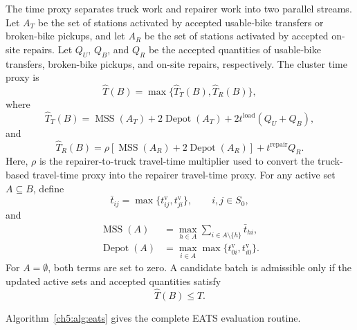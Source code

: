 The time proxy separates truck work and repairer work into two parallel streams.
Let $A_T$ be the set of stations activated by accepted usable-bike transfers or
broken-bike pickups, and let $A_R$ be the set of stations activated by accepted
on-site repairs. Let $Q_U$, $Q_B$, and $Q_R$ be the accepted quantities of
usable-bike transfers, broken-bike pickups, and on-site repairs, respectively.
The cluster time proxy is
\begin{equation}
\widehat T(B)=\max\{\widehat T_T(B),\widehat T_R(B)\},
\label{ch5:eq:eats-cluster-time}
\end{equation}
where
\begin{equation}
\widehat T_T(B)
=\operatorname{MSS}(A_T)
+2\operatorname{Depot}(A_T)
+2t^{\mathrm{load}}(Q_U+Q_B),
\label{ch5:eq:eats-truck-time}
\end{equation}
and
\begin{equation}
\widehat T_R(B)
=\rho\left[
\operatorname{MSS}(A_R)+2\operatorname{Depot}(A_R)
\right]
+t^{\mathrm{repair}}Q_R.
\label{ch5:eq:eats-repairer-time}
\end{equation}
Here, $\rho$ is the repairer-to-truck travel-time multiplier used to convert the truck-based
travel-time proxy into the repairer travel-time proxy.
For any active set $A\subseteq B$, define
\begin{equation}
\bar t_{ij}=\max\{t_{ij}^{\mathrm v},t_{ji}^{\mathrm v}\},
\qquad i,j\in S_0,
\label{ch5:eq:eats-symmetric-time}
\end{equation}
and
\begin{align}
\operatorname{MSS}(A)
&=\max_{h\in A}\sum_{i\in A\setminus\{h\}}\bar t_{hi},
\label{ch5:eq:eats-mss}\\
\operatorname{Depot}(A)
&=\max_{i\in A}\max\{t_{0i}^{\mathrm v},t_{i0}^{\mathrm v}\}.
\label{ch5:eq:eats-depot-bound}
\end{align}
For $A=\emptyset$, both terms are set to zero. A candidate batch is admissible
only if the updated active sets and accepted quantities satisfy
\begin{equation}
\widehat T(B)\le T.
\label{ch5:eq:eats-time-budget}
\end{equation}

Algorithm~\ref{ch5:alg:eats} gives the complete EATS evaluation routine.

